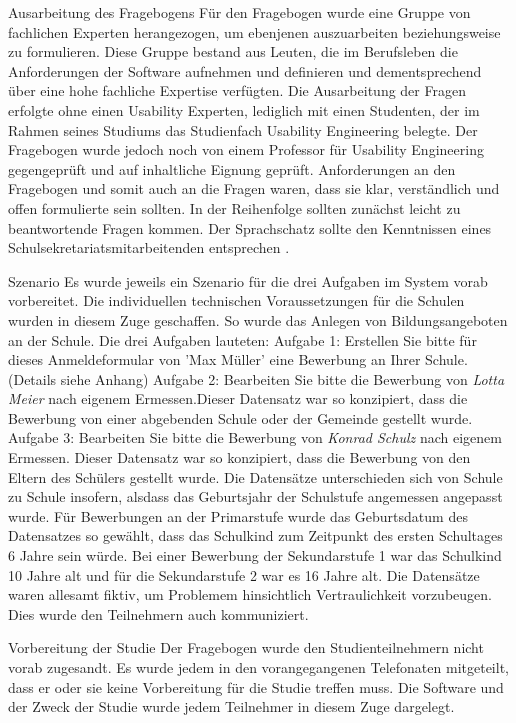 Ausarbeitung des Fragebogens
Für den Fragebogen wurde eine Gruppe von fachlichen Experten herangezogen, um ebenjenen auszuarbeiten beziehungsweise zu formulieren. Diese Gruppe bestand aus Leuten, die im Berufsleben die Anforderungen der Software aufnehmen und definieren und dementsprechend über eine hohe fachliche Expertise verfügten. Die Ausarbeitung der Fragen erfolgte ohne einen Usability Experten, lediglich mit einen Studenten, der im Rahmen seines Studiums das Studienfach \glqq Usability Engineering\grqq{} belegte. Der Fragebogen wurde jedoch noch von einem Professor für Usability Engineering gegengeprüft und auf inhaltliche Eignung geprüft. 
Anforderungen an den Fragebogen und somit auch an die Fragen waren, dass sie klar, verständlich und offen formulierte sein sollten. In der Reihenfolge sollten zunächst leicht zu beantwortende Fragen kommen. Der Sprachschatz sollte den Kenntnissen eines Schulsekretariatsmitarbeitenden entsprechen \cite{Kruse_2015}. 

Szenario
Es wurde jeweils ein Szenario für die drei Aufgaben im System vorab vorbereitet. Die individuellen technischen Voraussetzungen für die Schulen wurden in diesem Zuge geschaffen. So wurde das Anlegen von Bildungsangeboten an der Schule. Die drei Aufgaben lauteten:
Aufgabe 1: \glqq Erstellen Sie bitte für dieses Anmeldeformular von 'Max Müller' eine Bewerbung an Ihrer Schule.\glqq  (Details siehe Anhang)
Aufgabe 2: \glqq Bearbeiten Sie bitte die Bewerbung von \textit{Lotta Meier} nach eigenem Ermessen.\glqq  Dieser Datensatz war so konzipiert, dass die Bewerbung von einer abgebenden Schule oder der Gemeinde gestellt wurde.
Aufgabe 3: \glqq Bearbeiten Sie bitte die Bewerbung von \textit{Konrad Schulz} nach eigenem Ermessen\grqq{}. Dieser Datensatz war so konzipiert, dass die Bewerbung von den Eltern des Schülers gestellt wurde.
Die Datensätze unterschieden sich von Schule zu Schule insofern, alsdass das Geburtsjahr der Schulstufe angemessen angepasst wurde. Für Bewerbungen an der Primarstufe wurde das Geburtsdatum des Datensatzes so gewählt, dass das Schulkind zum Zeitpunkt des ersten Schultages 6 Jahre sein würde. Bei einer Bewerbung der Sekundarstufe 1 war das Schulkind 10 Jahre alt und für die Sekundarstufe 2 war es 16 Jahre alt. Die Datensätze waren allesamt fiktiv, um Problemem hinsichtlich Vertraulichkeit vorzubeugen. Dies wurde den Teilnehmern auch kommuniziert.

Vorbereitung der Studie 
Der Fragebogen wurde den Studienteilnehmern nicht vorab zugesandt. Es wurde jedem in den vorangegangenen Telefonaten mitgeteilt, dass er oder sie keine Vorbereitung für die Studie treffen muss. Die Software und der Zweck der Studie wurde jedem Teilnehmer in diesem Zuge dargelegt.

